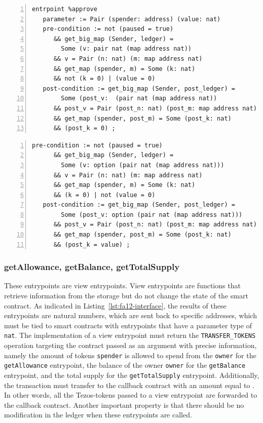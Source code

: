 \documentclass[a4paper,USenglish,cleveref, autoref,anonymous]{lipics-v2021}
\begin{document}
\begin{lstlisting}[float=tp,captionpos=b,caption={Specification of the \lstinline/approve/ entrypoint (Property 1)},label={lst:specification-approve-1},numbers=left]
entrpoint %approve
   parameter := Pair (spender: address) (value: nat)
   pre-condition := not (paused = true)
      && get_big_map (Sender, ledger) = 
        Some (v: pair nat (map address nat))
      && v = Pair (n: nat) (m: map address nat) 
      && get_map (spender, m) = Some (k: nat) 
      && not (k = 0) | (value = 0)
   post-condition := get_big_map (Sender, post_ledger) = 
        Some (post_v:  (pair nat (map address nat))
      && post_v = Pair (post_n: nat) (post_m: map address nat) 
      && get_map (spender, post_m) = Some (post_k: nat) 
      && (post_k = 0) ;
\end{lstlisting}
\begin{lstlisting}[float=tp,captionpos=b,caption={Specification of the \lstinline/approve/ entrypoint (Property 2)},label={lst:specification-approve-2},numbers=left]
   pre-condition := not (paused = true) 
      && get_big_map (Sender, ledger) = 
        Some (v: option (pair nat (map address nat))) 
      && v = Pair (n: nat) (m: map address nat) 
      && get_map (spender, m) = Some (k: nat) 
      && (k = 0) | not (value = 0)
   post-condition := get_big_map (Sender, post_ledger) = 
        Some (post_v: option (pair nat (map address nat))) 
      && post_v = Pair (post_n: nat) (post_m: map address nat) 
      && get_map (spender, post_m) = Some (post_k: nat) 
      && (post_k = value) ;
\end{lstlisting}

\subsubsection{getAllowance, getBalance,  getTotalSupply}
\label{sec:getall-getb-gett}

These entrypoints are view entrypoints. View entrypoints are functions
that retrieve information from the storage but do not change the state
of the smart contract. As indicated in
Listing~\ref{lst:fa12-interface}, the results of these entrypoints are
natural numbers, which are sent back to specific addresses, which must
be tied to smart contracts with entrypoints that have a parameter type
of \lstinline/nat/. The implementation of a view entrypoint must
return the \lstinline/TRANSFER_TOKENS/ operation targeting the
contract passed as an argument with precise information, namely the
amount of tokens \lstinline/spender/ is allowed to spend from the
\lstinline/owner/ for the \lstinline/getAllowance/ entrypoint, the
balance of the owner \lstinline/owner/ for the \lstinline/getBalance/
entrypoint, and the total supply for the \lstinline/getTotalSupply/
entrypoint. Additionally, the transaction must transfer to the
callback contract with an amount equal to \AMOUNT. In other words, all
the Tezos-tokens passed to a view entrypoint are forwarded to the
callback contract. Another important property is that there should be
no modification in the ledger when these entrypoints are called. 
\end{document}

